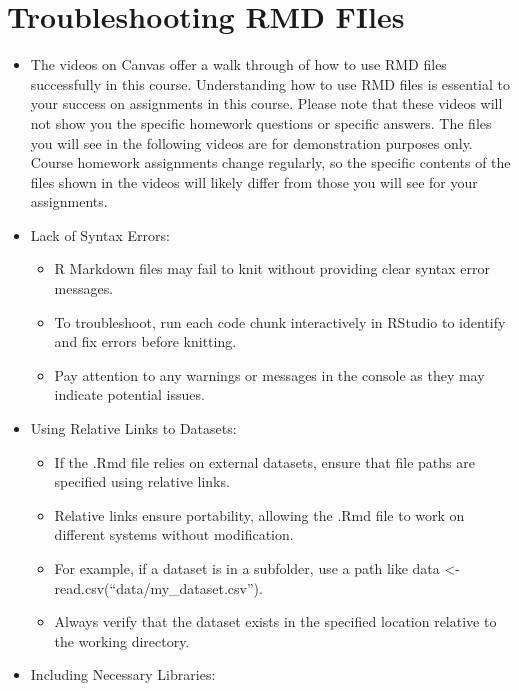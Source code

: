 \documentclass[
  letterpaper,
  DIV=11,
  numbers=noendperiod]{scrreprt}
\providecommand{\tightlist}{%
  \setlength{\itemsep}{0pt}\setlength{\parskip}{0pt}}\usepackage{longtable,booktabs,array}
\begin{document}
\section{Troubleshooting RMD FIles}\label{troubleshooting-rmd-files}

\begin{itemize}
\item
  The videos on Canvas offer a walk through of how to use RMD files
  successfully in this course. Understanding how to use RMD files is
  essential to your success on assignments in this course. Please note
  that these videos will not show you the specific homework questions or
  specific answers. The files you will see in the following videos are
  for demonstration purposes only. Course homework assignments change
  regularly, so the specific contents of the files shown in the videos
  will likely differ from those you will see for your assignments.
\item
  Lack of Syntax Errors:

  \begin{itemize}
  \tightlist
  \item
    R Markdown files may fail to knit without providing clear syntax
    error messages.
  \item
    To troubleshoot, run each code chunk interactively in RStudio to
    identify and fix errors before knitting.
  \item
    Pay attention to any warnings or messages in the console as they may
    indicate potential issues.
  \end{itemize}
\item
  Using Relative Links to Datasets:

  \begin{itemize}
  \tightlist
  \item
    If the .Rmd file relies on external datasets, ensure that file paths
    are specified using relative links.
  \item
    Relative links ensure portability, allowing the .Rmd file to work on
    different systems without modification.
  \item
    For example, if a dataset is in a subfolder, use a path like data
    \textless- read.csv(``data/my\_dataset.csv'').
  \item
    Always verify that the dataset exists in the specified location
    relative to the working directory.
  \end{itemize}
\item
  Including Necessary Libraries:


\end{itemize}
\end{document}
